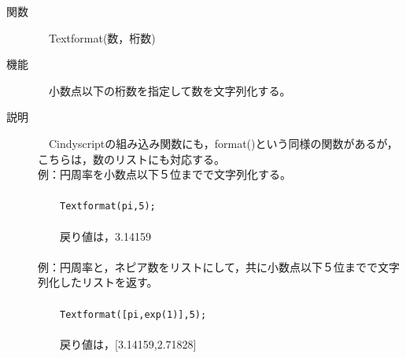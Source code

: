 \documentclass[papersize,a4paper,12pt,uplatex]{jsarticle}
\begin{document}
\begin{description}
\hypertarget{textformat}{}
\item[関数]　Textformat(数，桁数)
\item[機能]　小数点以下の桁数を指定して数を文字列化する。
\item[説明]　Cindyscriptの組み込み関数にも，format()という同様の関数があるが，こちらは，数のリストにも対応する。\\

例：円周率を小数点以下５位までで文字列化する。\\
　\\
　　\verb|Textformat(pi,5);|\\
　\\
　　戻り値は，3.14159\\
　\\
例：円周率と，ネピア数をリストにして，共に小数点以下５位までで文字列化したリストを返す。\\
　\\
　　\verb|Textformat([pi,exp(1)],5);|\\
　\\
　　戻り値は，[3.14159,2.71828] \\
 　\\


\end{description}
\end{document}
